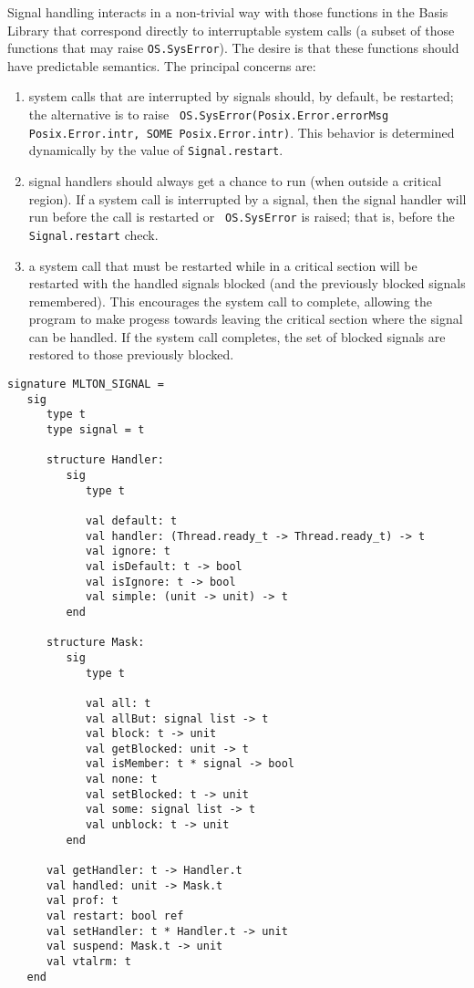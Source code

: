 Signal handling interacts in a non-trivial way with those functions in
the Basis Library that correspond directly to interruptable system
calls (a subset of those functions that may raise {\tt OS.SysError}).
The desire is that these functions should have predictable semantics.
The principal concerns are:
\begin{enumerate}
\item 
  system calls that are interrupted by signals should, by default, be
  restarted; the alternative is to raise {\tt
    OS.SysError(Posix.Error.errorMsg Posix.Error.intr, SOME
    Posix.Error.intr)}.  This behavior is determined dynamically by
  the value of {\tt Signal.restart}.
\item 
  signal handlers should always get a chance to run (when outside a
  critical region).  If a system call is interrupted by a signal, then
  the signal handler will run before the call is restarted or {\tt
    OS.SysError} is raised; that is, before the {\tt Signal.restart}
  check.
\item 
  a system call that must be restarted while in a critical section
  will be restarted with the handled signals blocked (and the
  previously blocked signals remembered).  This encourages the system
  call to complete, allowing the program to make progess towards
  leaving the critical section where the signal can be handled.  If
  the system call completes, the set of blocked signals are restored
  to those previously blocked.
\end{enumerate}

\begin{verbatim}
signature MLTON_SIGNAL =
   sig
      type t
      type signal = t

      structure Handler:
         sig
            type t

            val default: t
            val handler: (Thread.ready_t -> Thread.ready_t) -> t
            val ignore: t
            val isDefault: t -> bool
            val isIgnore: t -> bool
            val simple: (unit -> unit) -> t
         end

      structure Mask:
         sig
            type t
               
            val all: t
            val allBut: signal list -> t
            val block: t -> unit
            val getBlocked: unit -> t
            val isMember: t * signal -> bool
            val none: t
            val setBlocked: t -> unit
            val some: signal list -> t
            val unblock: t -> unit
         end

      val getHandler: t -> Handler.t
      val handled: unit -> Mask.t
      val prof: t
      val restart: bool ref
      val setHandler: t * Handler.t -> unit
      val suspend: Mask.t -> unit
      val vtalrm: t
   end
\end{verbatim}

